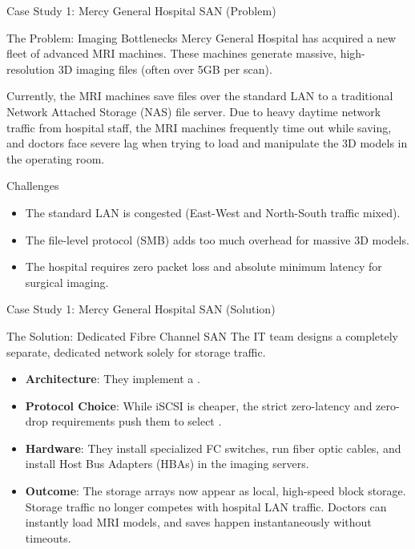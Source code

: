 \documentclass[aspectratio=169]{beamer}  %
\begin{document}
\begin{frame}[t]{Case Study 1: Mercy General Hospital SAN (Problem)}
    \begin{casestudy}{The Problem: Imaging Bottlenecks}
        \footnotesize
        Mercy General Hospital has acquired a new fleet of advanced MRI machines. These machines generate massive, high-resolution 3D imaging files (often over 5GB per scan). 
        
        Currently, the MRI machines save files over the standard LAN to a traditional Network Attached Storage (NAS) file server. Due to heavy daytime network traffic from hospital staff, the MRI machines frequently time out while saving, and doctors face severe lag when trying to load and manipulate the 3D models in the operating room.
    \end{casestudy}
    
    \begin{alertblock}{Challenges}
        \begin{itemize}
            \footnotesize
            \item The standard LAN is congested (East-West and North-South traffic mixed).
            \item The file-level protocol (SMB) adds too much overhead for massive 3D models.
            \item The hospital requires zero packet loss and absolute minimum latency for surgical imaging.
        \end{itemize}
    \end{alertblock}
\end{frame}

\begin{frame}[t]{Case Study 1: Mercy General Hospital SAN (Solution)}
    \begin{casesolution}{The Solution: Dedicated Fibre Channel SAN}
        \footnotesize
        The IT team designs a completely separate, dedicated network solely for storage traffic.
        \begin{itemize}
            \item \textbf{Architecture}: They implement a .
            \item \textbf{Protocol Choice}: While iSCSI is cheaper, the strict zero-latency and zero-drop requirements push them to select .
            \item \textbf{Hardware}: They install specialized FC switches, run fiber optic cables, and install Host Bus Adapters (HBAs) in the imaging servers.
            \item \textbf{Outcome}: The storage arrays now appear as local, high-speed block storage. Storage traffic no longer competes with hospital LAN traffic. Doctors can instantly load MRI models, and saves happen instantaneously without timeouts.
        \end{itemize}
    \end{casesolution}
\end{frame}
\end{document}
